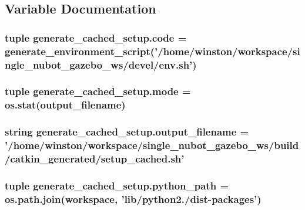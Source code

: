 \subsection{Variable Documentation}
\hypertarget{namespacegenerate__cached__setup_a4ed71aac3acd6cda6640f912559b5408}{
\subsubsection[{code}]{\setlength{\rightskip}{0pt plus 5cm}tuple generate\-\_\-cached\-\_\-setup.\-code = generate\-\_\-environment\-\_\-script('/home/winston/workspace/single\-\_\-nubot\-\_\-gazebo\-\_\-ws/devel/env.\-sh')}}\label{namespacegenerate__cached__setup_a4ed71aac3acd6cda6640f912559b5408}
\hypertarget{namespacegenerate__cached__setup_afd1a431f16a2a78ef0438a658e4ac3cf}{
\subsubsection[{mode}]{\setlength{\rightskip}{0pt plus 5cm}tuple generate\-\_\-cached\-\_\-setup.\-mode = os.\-stat({\bf output\-\_\-filename})}}\label{namespacegenerate__cached__setup_afd1a431f16a2a78ef0438a658e4ac3cf}
\hypertarget{namespacegenerate__cached__setup_a0265aee5075ee1eb701ff69c98ad6793}{
\subsubsection[{output\-\_\-filename}]{\setlength{\rightskip}{0pt plus 5cm}string generate\-\_\-cached\-\_\-setup.\-output\-\_\-filename = '/home/winston/workspace/single\-\_\-nubot\-\_\-gazebo\-\_\-ws/build/catkin\-\_\-generated/setup\-\_\-cached.\-sh'}}\label{namespacegenerate__cached__setup_a0265aee5075ee1eb701ff69c98ad6793}
\hypertarget{namespacegenerate__cached__setup_a770288702e38f06cf1b86a33bc07723e}{
\subsubsection[{python\-\_\-path}]{\setlength{\rightskip}{0pt plus 5cm}tuple generate\-\_\-cached\-\_\-setup.\-python\-\_\-path = os.\-path.\-join(workspace, 'lib/python2./dist-\/packages')}}\label{namespacegenerate__cached__setup_a770288702e38f06cf1b86a33bc07723e}
